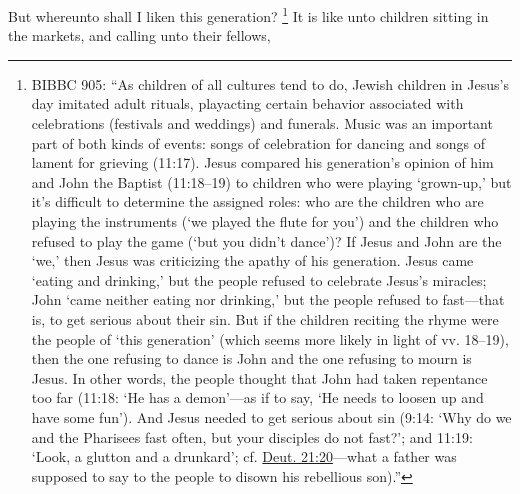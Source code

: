 			But whereunto shall I liken this generation?%
			\footnote{%
				BIBBC 905: ``As children of all cultures tend to do, Jewish children in Jesus's day imitated adult rituals, playacting certain behavior associated with celebrations (festivals and weddings) and funerals. Music was an important part of both kinds of events: songs of celebration for dancing and songs of lament for grieving (11:17). Jesus compared his generation's opinion of him and John the Baptist (11:18--19) to children who were playing `grown-up,' but it's difficult to determine the assigned roles: who are the children who are playing the instruments (`we played the flute for you') and the children who refused to play the game (`but you didn't dance')? If Jesus and John are the `we,' then Jesus was criticizing the apathy of his generation. Jesus came `eating and drinking,' but the people refused to celebrate Jesus's miracles; John `came neither eating nor drinking,' but the people refused to fast---that is, to get serious about their sin. But if the children reciting the rhyme were the people of `this generation' (which seems more likely in light of vv. 18--19), then the one refusing to dance is John and the one refusing to mourn is Jesus. In other words, the people thought that John had taken repentance too far (11:18: `He has a demon'---as if to say, `He needs to loosen up and have some fun'). And Jesus needed to get serious about sin (9:14: `Why do we and the Pharisees fast often, but your disciples do not fast?'; and 11:19: `Look, a glutton and a drunkard'; cf. \hyperref[DEUTERONOMY-21-20]{Deut. 21:20}---what a father was supposed to say to the people to disown his rebellious son).''
				}
			It is like unto children sitting in the markets, and calling unto their fellows,

			\begin{framed}
			\scriptsize
				\begin{compactdesc}
					\item[SBLG] 
				\end{compactdesc}
			\end{framed}

